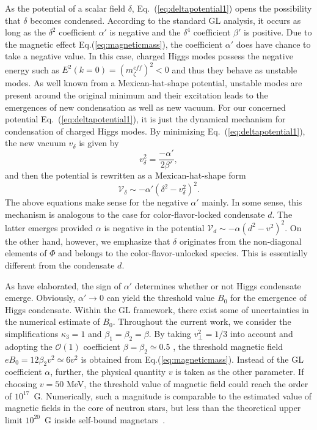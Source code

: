 \documentclass[12pt]{article}
\begin{document}
As the potential of a scalar field $\delta$, Eq.~(\ref{eq:deltapotential1}) opens the possibility that
$\delta$ becomes condensed. According to the standard GL analysis, it occurs as long as the $\delta^2$
coefficient $\alpha'$ is negative and the $\delta^4$ coefficient $\beta'$ is positive.
Due to the magnetic effect Eq.(\ref{eq:magneticmass}), the coefficient $\alpha'$ does have chance to
take a negative value.
In this case, charged Higgs modes possess the negative energy such as $E^2(k=0)=(m_\zeta^{eff})^2<0$
and thus they behave as unstable modes.
As well known from a Mexican-hat-shape potential, unstable modes are present around the original minimum
and their excitation leads to the emergences of new condensation as well as new vacuum.
For our concerned potential Eq.~(\ref{eq:deltapotential1}), it is just the dynamical mechanism for
condensation of charged Higgs modes. By minimizing Eq.~(\ref{eq:deltapotential1}), the new vacuum
$v_\delta$ is given by
\begin{equation}
\label{eq:vacuumexpectation}
v_\delta^2 = \frac{- \alpha'} {2\beta'},
\end{equation}
and then the potential is rewritten as a Mexican-hat-shape form
\begin{equation}
\label{eq:deltapotential}
\mathcal{V}_\delta \sim - \alpha'(\delta^2 - v_\delta^2)^2.
\end{equation}
The above equations make sense for the negative $\alpha'$ mainly.
In some sense, this mechanism is analogous to the case for color-flavor-locked condensate $d$.
The latter emerges provided $\alpha$ is negative in the potential $\mathcal{V}_d \sim - \alpha (d^2 - v^2)^2$.
On the other hand, however, we emphasize that $\delta$ originates from the non-diagonal
elements of $\Phi$ and belongs to the color-flavor-unlocked species. This is essentially
different from the condensate $d$.

As have elaborated, the sign of $\alpha'$ determines whether or not Higgs condensate emerge.
Obviously, $\alpha' \rightarrow 0$ can yield the threshold value $B_0$ for the emergence of Higgs
condensate.
Within the GL framework, there exist some of uncertainties in the numerical estimate of $B_0$.
Throughout the current work, we consider the simplifications $\kappa_3=1$ and $\beta_1=\beta_2=\beta$.
By taking $v_\perp^2=1/3$ into account and adopting the $\mathscr{O}(1)$ coefficient $\beta=\beta_2\simeq${0.5} \cite{balachandran2006semisuperfluid}, the threshold magnetic field $eB_0 = 12\beta_2 v^2 \simeq 6v^2$ is
obtained from Eq.(\ref{eq:magneticmass}).
Instead of the GL coefficient $\alpha$, further, the physical
quantity $v$ is taken as the other parameter.
If choosing $v = 50$ MeV, the threshold value of magnetic field could reach the
order of $10^{17}$~G. Numerically, such a magnitude is comparable to the estimated value of
magnetic fields in the core of neutron stars, but less than the theoretical upper
limit $10^{20}$~G inside self-bound magnetars~\cite{dong2001,lai1991cold}.
\end{document}
